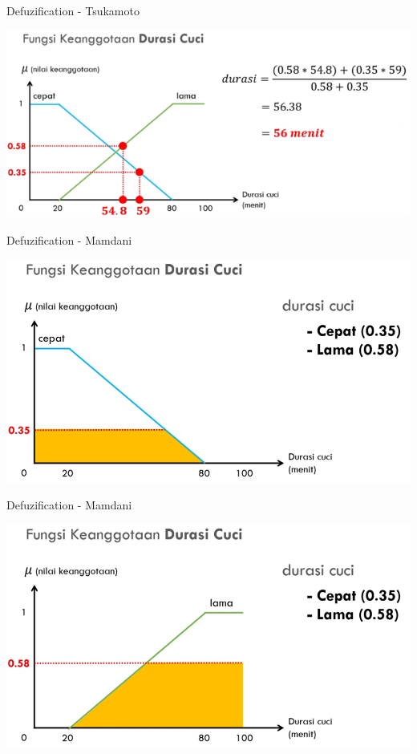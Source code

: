\documentclass[pdflatex,compress,mathserif]{beamer}
\begin{document}
\begin{frame}{Defuzification - Tsukamoto}
	\begin{center}
		\includegraphics[width=\linewidth]{img/41}
	\end{center}
\end{frame}

\begin{frame}{Defuzification - Mamdani}
	\begin{center}
		\includegraphics[width=\linewidth]{img/42}
	\end{center}
\end{frame}

\begin{frame}{Defuzification - Mamdani}
	\begin{center}
		\includegraphics[width=\linewidth]{img/43}
	\end{center}
\end{frame}
\end{document}
